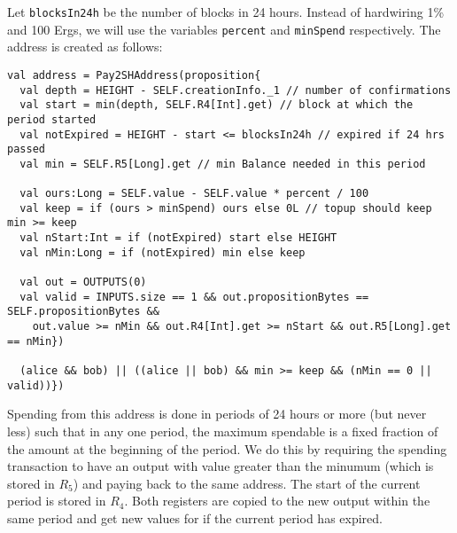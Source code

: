\documentclass[11pt]{article}
\begin{document}
Let \texttt{blocksIn24h} be the number of blocks in 24 hours. Instead of hardwiring 1\% and 100 Ergs, we will use the variables \texttt{percent} and \texttt{minSpend} respectively. The address is created as follows:
\begin{verbatim}
val address = Pay2SHAddress(proposition{
  val depth = HEIGHT - SELF.creationInfo._1 // number of confirmations
  val start = min(depth, SELF.R4[Int].get) // block at which the period started
  val notExpired = HEIGHT - start <= blocksIn24h // expired if 24 hrs passed
  val min = SELF.R5[Long].get // min Balance needed in this period

  val ours:Long = SELF.value - SELF.value * percent / 100
  val keep = if (ours > minSpend) ours else 0L // topup should keep min >= keep
  val nStart:Int = if (notExpired) start else HEIGHT
  val nMin:Long = if (notExpired) min else keep

  val out = OUTPUTS(0)  
  val valid = INPUTS.size == 1 && out.propositionBytes == SELF.propositionBytes &&
    out.value >= nMin && out.R4[Int].get >= nStart && out.R5[Long].get == nMin})
    
  (alice && bob) || ((alice || bob) && min >= keep && (nMin == 0 || valid))})
\end{verbatim}

Spending from this address is done in periods of 24 hours or more (but never less) such that in any one period, the maximum spendable is a fixed fraction of the amount at the beginning of the period. We do this by requiring the spending transaction to have an output with value greater than the minumum (which is stored in $R_5$) and paying back to the same address. The start of the current period is stored in $R_4$. Both registers are copied to the new output within the same period and get new values for if the current period has expired.


%
%
\end{document}

